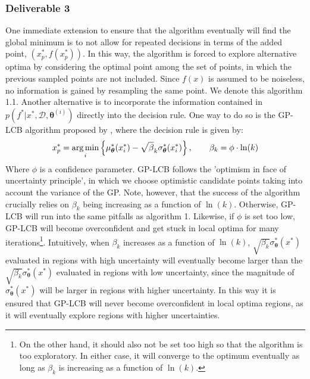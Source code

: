 \subsubsection*{Deliverable 3}
One immediate extension to ensure that the algorithm eventually will find the global minimum is to not allow for repeated decisions in terms of the added point, $(x_p^*, f(x_p^*))$. In this way, the algorithm is forced to explore alternative optima by considering the optimal point among the set of points, in which the previous sampled points are not included. Since $f(x)$ is assumed to be noiseless, no information is gained by resampling the same point. We denote this algorithm 1.1. Another alternative is to incorporate the information contained in $p(f^*|x^*,\mathcal{D},\bm{\theta}^{(i)})$ directly into the decision rule. One way to do so is the GP-LCB algorithm proposed by \cite{Srinivas_2012}, where the decision rule is given by:
\begin{equation}
    x_p^* = \operatorname*{arg\,min}_i \left\{ \mu_{\bm{\theta}}^*(x_i^*) - \sqrt{\beta}_k \sigma_{\bm{\theta}}^*(x_i^*)\right\}, \qquad \beta_k = \phi\cdot\ln(k)
\end{equation}
Where $\phi$ is a confidence parameter. GP-LCB follows the 'optimism in face of uncertainty principle', in which we choose optimistic candidate points taking into account the variance of the GP. Note, however, that the success of the algorithm crucially relies on $\beta_k$ being increasing as a function of $\ln(k)$. Otherwise, GP-LCB will run into the same pitfalls as algorithm 1. Likewise, if $\phi$ is set too low, GP-LCB will become overconfident and get stuck in local optima for many iterations\footnote{On the other hand, it should also not be set too high so that the algorithm is too exploratory. In either case, it will converge to the optimum eventually as long as $\beta_k$ is increasing as a function of $\ln(k)$.}. Intuitively, when $\beta_k$ increases as a function of $\ln(k)$, $\sqrt{\beta_k}\sigma_{\bm{\theta}}^*(x^*)$ evaluated in regions with high uncertainty will eventually become larger than the $\sqrt{\beta_k}\sigma_{\bm{\theta}}^*(x^*)$ evaluated in regions with low uncertainty, since the magnitude of $\sigma_{\bm{\theta}}^*(x^*)$ will be larger in regions with higher uncertainty. In this way it is ensured that GP-LCB will never become overconfident in local optima regions, as it will eventually explore regions with higher uncertainties.\\
